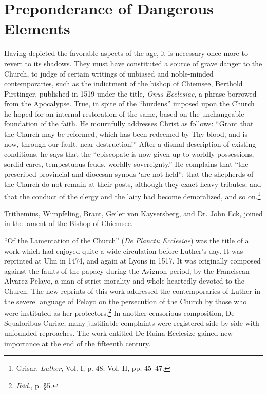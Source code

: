 \section{Preponderance of Dangerous Elements}

Having depicted the favorable aspects of the age, it is necessary
once more to revert to its shadows. They must have constituted a
source of grave danger to the Church, to judge of certain writings
of unbiased and noble-minded contemporaries, such as the indictment of
the bishop of Chiemsee, Berthold Pirstinger, published in
1519 under the title, \textit{Onus Ecclesiae}, a phrase borrowed from the
Apocalypse. True, in spite of the “burdens” imposed upon the Church
he hoped for an internal restoration of the same, based on the unchangeable
foundation of the faith. He mournfully addresses Christ
as follows: “Grant that the Church may be reformed, which has
been redeemed by Thy blood, and is now, through our fault, near
destruction!” After a dismal description of existing conditions, he
says that the “episcopate is now given up to worldly possessions,
sordid cares, tempestuous feuds, worldly sovereignty.” He complains
that “the prescribed provincial and diocesan synods ‘are not held”;
that the shepherds of the Church do not remain at their posts, although
they exact heavy tributes; and that the conduct of the clergy
and the laity had become demoralized, and so on.\footnote
{Grisar, \textit{Luther}, Vol. I, p. 48; Vol. II, pp. 45--47.}

Trithemius, Wimpfeling, Brant, Geiler von Kaysersberg, and Dr.
John Eck, joined in the lament of the Bishop of Chiemsee.

“Of the Lamentation of the Church” (\textit{De Planctu Ecclesiae})
was the title of a work which had enjoyed quite a wide circulation
before Luther’s day. It was reprinted at Ulm in 1474, and again at
Lyons in 1517. It was originally composed against the faults of
the papacy during the Avignon period, by the Franciscan Alvarez
Pelayo, a man of strict morality and whole-heartedly devoted to the
Church. The new reprints of this work addressed the contemporaries
of Luther in the severe language of Pelayo on the persecution of
the Church by those who were instituted as her protectors.\footnote{\textit{Ibid.}, p. §5.}
In another censorious composition, De Squaloribus Curiae, many justifiable
complaints were registered side by side with unfounded reproaches. The
work entitled De Ruina Ecclesize gained new importance
at the end of the fifteenth century.


